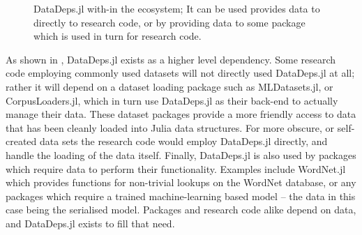 \documentclass[twoside,11pt]{article}
\begin{document}
\begin{figure}
	\centering
	\caption{DataDeps.jl with-in the ecosystem; It can be used provides data to directly to research code, or by providing data to some package which is used in turn for research code. \label{fig:eco}}
\end{figure}

As shown in , DataDeps.jl exists as a higher level dependency.
Some research code employing commonly used datasets will not directly used DataDeps.jl at all;
rather it will depend on a dataset loading package such as MLDatasets.jl,
or CorpusLoaders.jl, which in turn use DataDeps.jl as their back-end to actually manage their data.
These dataset packages provide a more friendly access to data that has been cleanly loaded into Julia data structures.
For more obscure, or self-created data sets the research code would employ DataDeps.jl directly, and handle the loading of the data itself.
Finally, DataDeps.jl is also used by packages which require data to perform their functionality.
Examples include WordNet.jl which provides functions for non-trivial lookups on the WordNet \citep{miller1995wordnet} database,
or any packages which require a trained machine-learning based model -- the data in this case being the serialised model.
Packages and research code alike depend on data, and DataDeps.jl exists to fill that need.
\end{document}
